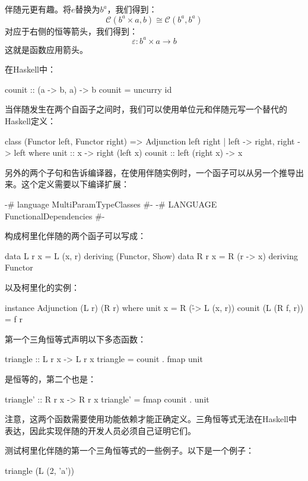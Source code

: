 \documentclass[DaoFP]{subfiles}
\begin{document}
    伴随元更有趣。将$e$替换为$b^a$，我们得到：
    \[  \mathcal{C}(b^a \times a, b ) \cong  \mathcal{C} (b^a, b^a)  \]
    对应于右侧的恒等箭头，我们得到：
    \[ \varepsilon \colon b^a \times a \to b \]
    这就是函数应用箭头。

    在Haskell中：
    \begin{haskell}
        counit :: (a -> b, a) -> b
        counit = uncurry id
    \end{haskell}

    当伴随发生在两个自函子之间时，我们可以使用单位元和伴随元写一个替代的Haskell定义：
    \begin{haskell}
        class (Functor left, Functor right) =>
        Adjunction left right | left -> right, right -> left where
        unit   :: x -> right (left x)
        counit :: left (right x) -> x
    \end{haskell}
    另外的两个子句和告诉编译器，在使用伴随实例时，一个函子可以从另一个推导出来。这个定义需要以下编译扩展：
    \begin{haskell}
    {-# language MultiParamTypeClasses #-}
    {-# LANGUAGE FunctionalDependencies #-}
    \end{haskell}

    构成柯里化伴随的两个函子可以写成：
    \begin{haskell}
        data L r x = L (x, r)    deriving (Functor, Show)
        data R r x = R (r -> x)  deriving Functor
    \end{haskell}
    以及柯里化的实例：
    \begin{haskell}
        instance Adjunction (L r) (R r) where
        unit x = R (\r -> L (x, r))
        counit (L (R f, r)) = f r
    \end{haskell}
    第一个三角恒等式声明以下多态函数：
    \begin{haskell}
        triangle :: L r x -> L r x
        triangle = counit . fmap unit
    \end{haskell}
    是恒等的，第二个也是：
    \begin{haskell}
        triangle' :: R r x -> R r x
        triangle' = fmap counit . unit
    \end{haskell}
    注意，这两个函数需要使用功能依赖才能正确定义。三角恒等式无法在Haskell中表达，因此实现伴随的开发人员必须自己证明它们。
    \begin{exercise}
        测试柯里化伴随的第一个三角恒等式的一些例子。以下是一个例子：
        \begin{haskell}
            triangle (L (2, 'a'))
        \end{haskell}
    \end{exercise}
\end{document}
